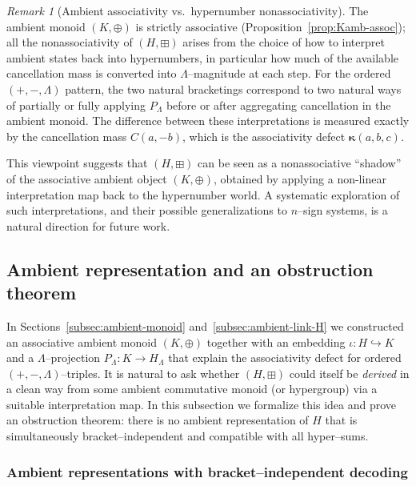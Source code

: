 \documentclass[11pt]{amsart}
\numberwithin{equation}{section}
\theoremstyle{definition}
\theoremstyle{remark}
\newtheorem{remark}[theorem]{Remark}
\newcommand{\Hnum}{H}                      %
\newcommand{\AssocCurv}{\boldsymbol{\kappa}} %
\newcommand{\Kamb}{K}                      %
\newcommand{\op}{\boxplus}                 %
\newcommand{\Cfun}{C}                      %
\begin{document}
\begin{remark}[Ambient associativity vs.\ hypernumber nonassociativity]
\label{rem:ambient-vs-H}
The ambient monoid $(\Kamb,\oplus)$ is strictly associative
(Proposition~\ref{prop:Kamb-assoc}); all the nonassociativity of
$(\Hnum,\op)$ arises from the choice of how to interpret ambient
states back into hypernumbers, in particular how much of the available
cancellation mass is converted into $\Lambda$--magnitude at each step.
For the ordered $(+,-,\Lambda)$ pattern, the two natural bracketings
correspond to two natural ways of partially or fully applying
$P_\Lambda$ before or after aggregating cancellation in the ambient
monoid.  The difference between these interpretations is measured
exactly by the cancellation mass $\Cfun(a,-b)$, which is the
associativity defect $\AssocCurv(a,b,c)$.

This viewpoint suggests that $(\Hnum,\op)$ can be seen as a
nonassociative ``shadow'' of the associative ambient object
$(\Kamb,\oplus)$, obtained by applying a non-linear interpretation map
back to the hypernumber world.  A systematic exploration of such
interpretations, and their possible generalizations to $n$--sign
systems, is a natural direction for future work.
\end{remark}

\subsection{Ambient representation and an obstruction theorem}
\label{subsec:ambient-nogo}

In Sections~\ref{subsec:ambient-monoid} and~\ref{subsec:ambient-link-H}
we constructed an associative ambient monoid $(\Kamb,\oplus)$ together
with an embedding $\iota:\Hnum\hookrightarrow\Kamb$ and a
$\Lambda$–projection $P_\Lambda:\Kamb\to H_\Lambda$ that explain the
associativity defect for ordered $(+,-,\Lambda)$–triples.  It is
natural to ask whether $(\Hnum,\op)$ could itself be \emph{derived} in
a clean way from some ambient commutative monoid (or hypergroup) via a
suitable interpretation map.  In this subsection we formalize this
idea and prove an obstruction theorem: there is no ambient representation of
$\Hnum$ that is simultaneously bracket–independent and compatible with
all hyper–sums.

\subsubsection*{Ambient representations with bracket–independent decoding}
\end{document}
